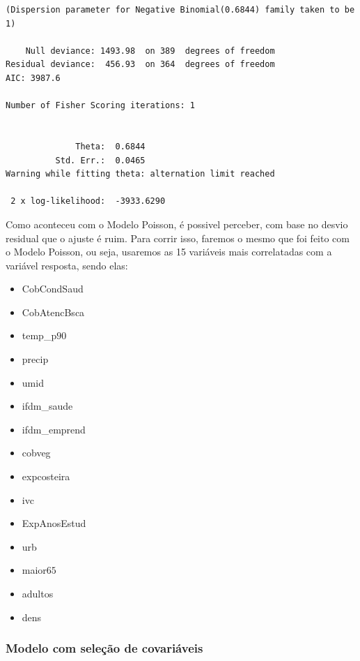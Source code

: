 \documentclass[12pt,a4paper]{article}\usepackage[]{graphicx}\usepackage[]{color}
\makeatletter
\newenvironment{kframe}{%
 \def\at@end@of@kframe{}%
 \ifinner\ifhmode%
  \def\at@end@of@kframe{\end{minipage}}%
  \begin{minipage}{\columnwidth}%
 \fi\fi%
 \def\FrameCommand##1{\hskip\@totalleftmargin \hskip-\fboxsep
 \colorbox{shadecolor}{##1}\hskip-\fboxsep
     \hskip-\linewidth \hskip-\@totalleftmargin \hskip\columnwidth}%
 \MakeFramed {\advance\hsize-\width
   \@totalleftmargin\z@ \linewidth\hsize
   \@setminipage}}%
 {\par\unskip\endMakeFramed%
 \at@end@of@kframe}
\newenvironment{knitrout}{}{} %
\makeatother
\begin{document}
\begin{knitrout}
\begin{kframe}
\begin{verbatim}
(Dispersion parameter for Negative Binomial(0.6844) family taken to be 1)

    Null deviance: 1493.98  on 389  degrees of freedom
Residual deviance:  456.93  on 364  degrees of freedom
AIC: 3987.6

Number of Fisher Scoring iterations: 1


              Theta:  0.6844 
          Std. Err.:  0.0465 
Warning while fitting theta: alternation limit reached 

 2 x log-likelihood:  -3933.6290 
\end{verbatim}
\end{kframe}
\end{knitrout}
Como aconteceu com o Modelo Poisson, é possivel perceber, com base no desvio residual que o ajuste é ruim. Para corrir isso, faremos o mesmo que foi feito com o Modelo Poisson, ou seja, usaremos as 15 variáveis mais correlatadas com a variável resposta, sendo elas:

\begin{itemize}
  \item CobCondSaud
  \item CobAtencBsca
  \item temp\_p$90$
  \item precip
  \item umid
  \item ifdm\_saude
  \item ifdm\_emprend
  \item cobveg
  \item expcosteira
  \item ivc
  \item ExpAnosEstud
  \item urb
  \item maior$65$
  \item adultos
  \item dens
\end{itemize}

\subsubsection{\textbf{Modelo com seleção de covariáveis}}
\end{document}

